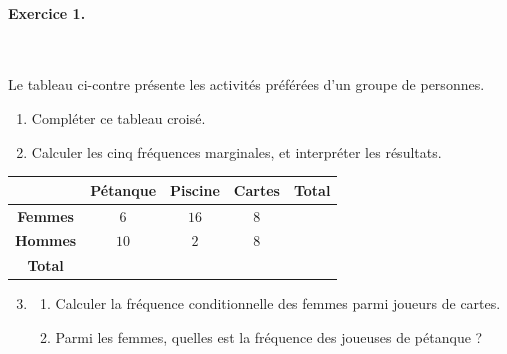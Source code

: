 \documentclass[11pt]{article}
\begin{document}

\paragraph{Exercice 1.}~\\
\begin{minipage}{.4\textwidth}
  Le tableau ci-contre présente les activités préférées d'un groupe de
  personnes.
  \begin{enumerate}
    \item Compléter ce tableau croisé.
    \item Calculer les cinq fréquences marginales, et interpréter les résultats.
  \end{enumerate}
\end{minipage}
\begin{minipage}{.6\textwidth}
\begin{center}
\renewcommand{\arraystretch}{2}
\begin{tabular}{|c|c|c|c|c|}
  \cline{2-5}
  \multicolumn{1}{c|}{} & \textbf{Pétanque} & \textbf{Piscine} &
  \textbf{Cartes} & \textbf{Total} \\
  \hline
  \textbf{Femmes} & $6$ & $16$ & $8$ & \\
  \hline
  \textbf{Hommes} & $10$ & $2$ & $8$ & \\
  \hline
  \textbf{Total} & & & & \\
  \hline
\end{tabular}
\end{center}
\end{minipage}
\begin{enumerate}
    \setcounter{enumi}{2}
    \item \begin{enumerate}
        \item Calculer la fréquence conditionnelle des femmes parmi joueurs de
          cartes.
        \item Parmi les femmes, quelles est la fréquence des joueuses de
          pétanque ?
  \end{enumerate}
\end{enumerate}
\end{document}
